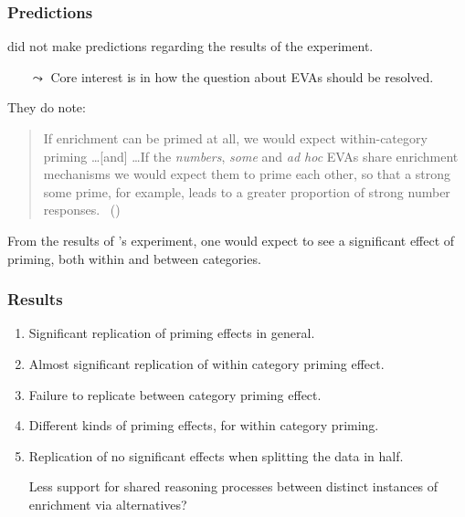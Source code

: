 \documentclass[noamssymb]{beamer}
\newcommand{\hand}{\ding{43}}
\begin{document}
\begin{frame}
\frametitle{{\ftf Predictions}}

\citeauthor{Bott:2016aa} did not make predictions regarding the results of the experiment.
\begin{itemize}
\item[\(\leadsto\)] Core interest is in how the question about EVAs should be resolved.
\end{itemize}


They do note:
\begin{quote}
  If enrichment can be primed at all, we would expect within-category priming \dots [and] \dots If the \emph{numbers}, \emph{some} and \emph{ad hoc} EVAs share enrichment mechanisms we would expect them to prime each other, so that a strong some prime, for example, leads to a greater proportion of strong number responses.\linebreak
  \mbox{ }\hfill(\citeyear[122]{Bott:2016aa})
\end{quote}

From the results of \citeauthor{Bott:2016aa}'s experiment, one would expect to see a significant effect of priming, both within and between categories.
\end{frame}

\begin{frame}

  \frametitle{{\ftf Results}}

  \begin{enumerate}[label=\arabic*.]
  \item Significant replication of priming effects in general.
  \item Almost significant replication of within category priming effect.
  \item Failure to replicate between category priming effect.
  \item Different kinds of priming effects, for within category priming.
  \item Replication of no significant effects when splitting the data in half.
  \end{enumerate}

  \begin{itemize}
  \item[\hand] Less support for shared reasoning processes between distinct instances of enrichment via alternatives?
  \end{itemize}

\end{frame}
\end{document}

